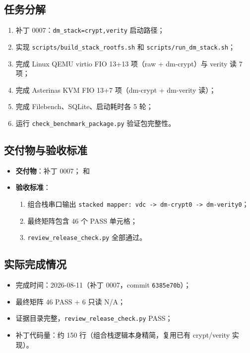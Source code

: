 \subsection{任务分解}
\begin{enumerate}
    \item 补丁 0007：\texttt{dm\_stack=crypt,verity} 启动路径；
    \item 实现 \texttt{scripts/build\_stack\_rootfs.sh} 和 \texttt{scripts/run\_dm\_stack.sh}；
    \item 完成 Linux QEMU virtio FIO 13+13 项（raw + dm-crypt）与 verity 读 7 项；
    \item 完成 Asterinas KVM FIO 13+7 项（dm-crypt + dm-verity 读）；
    \item 完成 Filebench、SQLite、启动耗时各 5 轮；
    \item 运行 \texttt{check\_benchmark\_package.py} 验证包完整性。
\end{enumerate}

\subsection{交付物与验收标准}
\begin{itemize}
    \item \textbf{交付物}：补丁 0007；\texttt{} 和 \texttt{}
    \item \textbf{验收标准}：
    \begin{enumerate}
        \item 组合栈串口输出 \texttt{stacked mapper: vdc -> dm-crypt0 -> dm-verity0}；
        \item 最终矩阵包含 46 个 PASS 单元格；
        \item \texttt{review\_release\_check.py} 全部通过。
    \end{enumerate}
\end{itemize}

\subsection{实际完成情况}
\begin{itemize}
    \item 完成时间：2026-08-11（补丁 0007，commit \texttt{6385e70b}）；
    \item 最终矩阵 46 PASS + 6 只读 N/A；
    \item 证据目录完整，\texttt{review\_release\_check.py} PASS；
    \item 补丁代码量：约 150 行（组合栈逻辑本身精简，复用已有 crypt/verity 实现）。
\end{itemize}


